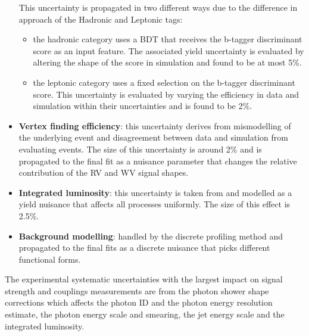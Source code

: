 \begin{itemize}[noitemsep]
{           This uncertainty is propagated in two different ways due to the difference in approach of the \ttH Hadronic and \ttH Leptonic tags:
           \begin{itemize}[noitemsep]
               \item[\textbullet] the hadronic category uses a BDT that receives the b-tagger discriminant score as an input feature. The associated yield uncertainty is evaluated by altering the shape of the score in simulation and found to be at most 5\%.
               \item[\textbullet] the leptonic category uses a fixed selection on the b-tagger discriminant score. This uncertainty is evaluated by varying the efficiency in data and simulation within their uncertainties and is found to be 2\%.  
           \end{itemize}
           }
    \item {\textbf{Vertex finding efficiency}: 
           this uncertainty derives from mismodelling of the underlying event and disagreement between data and simulation from evaluating \Zmumu events. The size of this uncertainty is around 2\% and is propagated to the final fit as a nuisance parameter that changes the relative contribution of the RV and WV signal shapes.
           }
    \item {\textbf{Integrated luminosity}: 
        this uncertainty is taken from \cite{LumiUncert} and modelled as a yield nuisance that affects all processes uniformly. The size of this effect is 2.5\%.
           }
    \item {\textbf{Background modelling}: 
           handled by the discrete profiling method and propagated to the final fits as a discrete nuisance that picks different functional forms. 
           }
\end{itemize}

The experimental systematic uncertainties with the largest impact on signal strength and couplings measurements are from the photon shower shape corrections which affects the photon ID and the photon energy resolution estimate, the photon energy scale and smearing, the jet energy scale and the integrated luminosity.









